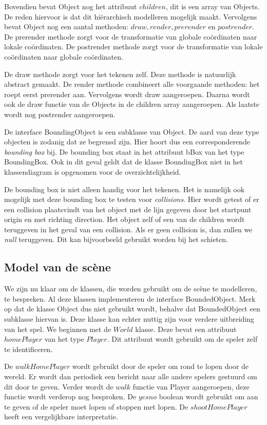 \documentclass[a4paper,11pt]{article}
\begin{document}
Bovendien bevat Object nog het attribuut $children$, dit is een array van Objects. De reden hiervoor is dat dit hi\"erarchisch modelleren mogelijk maakt. Vervolgens bevat Object nog een aantal methoden: $draw, render, prerender$ en $postrender$. De prerender methode zorgt voor de transformatie van globale co\"ordinaten naar lokale co\"ordinaten. De postrender methode zorgt voor de transformatie van lokale co\"ordinaten naar globale co\"ordinaten.

De draw methode zorgt voor het tekenen zelf. Deze methode is natuurlijk abstract gemaakt. De render methode combineert alle voorgaande methoden: het roept eerst prerender aan. Vervolgens wordt draw aangeroepen. Daarna wordt ook de draw functie van de Objects in de children array aangeroepen. Als laatste wordt nog postrender aangeroepen.

De interface BoundingObject is een subklasse van Object. De aard van deze type objecten is zodanig dat ze begrensd zijn. Hier hoort dus een corresponderende \emph{bounding box} bij. De bounding box staat in het attribuut bBox van het type BoundingBox. Ook in dit geval geldt dat de klasse BoundingBox niet in het klassendiagram is opgenomen voor de overzichtelijkheid.

De bounding box is niet alleen handig voor het tekenen. Het is namelijk ook mogelijk met deze bounding box te testen voor \emph{collisions}. Hier wordt getest of er een collision plaatsvindt van het object met de lijn gegeven door het startpunt origin en met richting direction. Het object zelf of een van de children wordt teruggeven in het geval van een collision. Als er geen collision is, dan zullen we \emph{null} teruggeven. Dit kan bijvoorbeeld gebruikt worden bij het schieten.

\subsection{Model van de sc\`ene}
    \label{sec:model}
We zijn nu klaar om de klassen, die worden gebruikt om de sc\`ene te modelleren, te bespreken.  Al deze klassen implementeren de interface BoundedObject. Merk op dat de klasse Object dus niet gebruikt wordt, behalve dat BoundedObject een subklasse hiervan is. Deze klasse kan echter nuttig zijn voor verdere uitbreiding van het spel. We beginnen met de $World$ klasse. Deze bevat een attribuut $homePlayer$ van het type $Player$. Dit attribuut wordt gebruikt om de speler zelf te identificeren.

De $walkHomePlayer$ wordt gebruikt door de speler om rond te lopen door de wereld. Er wordt dan periodiek een bericht naar alle andere spelers gestuurd om dit door te geven. Verder wordt de $walk$ functie van Player aangeroepen, deze functie wordt verderop nog besproken. De $yesno$ boolean wordt gebruikt om aan te geven of de speler moet lopen of stoppen met lopen. De $shootHomePlayer$ heeft een vergelijkbare interpretatie.
\end{document}
